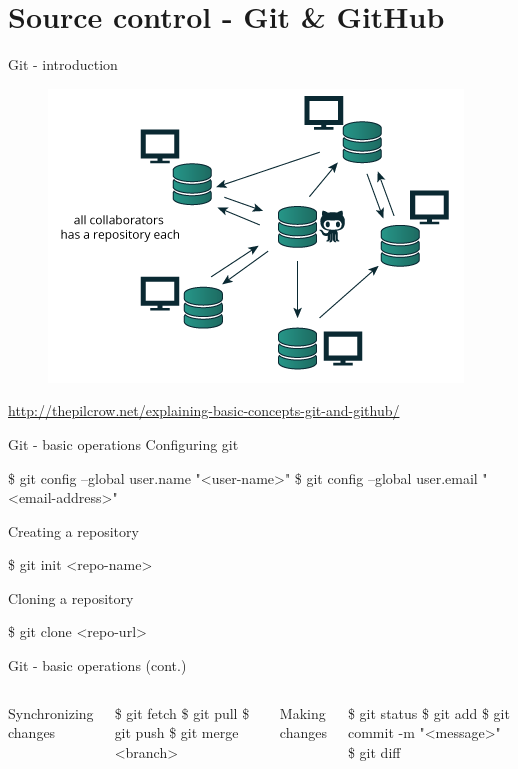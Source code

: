 \documentclass[aspectratio=169]{beamer}
\begin{document}
	\section{Source control - Git \& GitHub}
	\begin{frame}{Git - introduction}	
		\begin{figure}
			\centering
			\includegraphics[width=0.6\linewidth]{images/distributed-vc}
		\end{figure}
		\tiny \hyperlink{http://thepilcrow.net/explaining-basic-concepts-git-and-github/}{http://thepilcrow.net/explaining-basic-concepts-git-and-github/} 
	\end{frame}
	\begin{frame}{Git - basic operations}
		Configuring git
		\begin{semiverbatim}
			\$ git config --global user.name "<user-name>" 
			\newline
			\$ git config --global user.email "<email-address>"
		\end{semiverbatim}
		Creating a repository
		\begin{semiverbatim}
			\$ git init <repo-name>
		\end{semiverbatim}
		Cloning a repository
		\begin{semiverbatim}
			\$ git clone <repo-url>
		\end{semiverbatim}
	\end{frame}
	\begin{frame}{Git - basic operations (cont.)}
		\begin{columns}
			\column{0.5\linewidth}
				Synchronizing changes
				\begin{semiverbatim}
					\$ git fetch
					\newline
					\$ git pull
					\newline
					\$ git push
					\newline
					\$ git merge <branch>
				\end{semiverbatim}
			\column{0.5\linewidth}
				Making changes
				\begin{semiverbatim}
					\$ git status
					\newline
					\$ git add
					\newline
					\$ git commit -m "<message>"
					\newline
					\$ git diff
				\end{semiverbatim}
		\end{columns}
	\end{frame}
\end{document}
